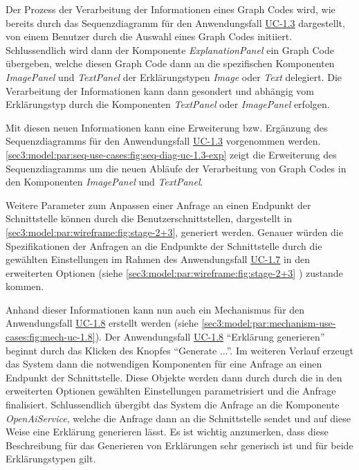 Der Prozess der Verarbeitung der Informationen eines Graph Codes wird, wie bereits durch das Sequenzdiagramm für den Anwendungsfall \hyperref[sec3:model:uc-1.3]{UC-1.3} dargestellt, von einem Benutzer durch die Auswahl eines Graph Codes initiiert.
Schlussendlich wird dann der Komponente \textit{ExplanationPanel} ein Graph Code übergeben, welche diesen Graph Code dann an die spezifischen Komponenten \textit{ImagePanel} und \textit{TextPanel} der Erklärungstypen \textit{Image} oder \textit{Text} delegiert.
Die Verarbeitung der Informationen kann dann gesondert und abhängig vom Erklärungstyp durch die Komponenten \textit{TextPanel} oder \textit{ImagePanel} erfolgen.

Mit diesen neuen Informationen kann eine Erweiterung bzw. Ergänzung des Sequenzdiagramms für den Anwendungsfall \hyperref[sec3:model:uc-1.3]{UC-1.3} vorgenommen werden.
\cref{sec3:model:par:seq-use-cases:fig:seq-diag-uc-1.3-exp} zeigt die Erweiterung des Sequenzdiagramms um die neuen Abläufe der Verarbeitung von Graph Codes in den Komponenten \textit{ImagePanel} und \textit{TextPanel}.




Weitere Parameter zum Anpassen einer Anfrage an einen Endpunkt der Schnittstelle können durch die Benutzerschnittstellen, dargestellt in \cref{sec3:model:par:wireframe:fig:stage-2+3}, generiert werden.
Genauer würden die Spezifikationen der Anfragen an die Endpunkte der Schnittstelle durch die gewählten Einstellungen im Rahmen des Anwendungsfall \hyperref[sec3:model:uc-1.7]{UC-1.7} in den erweiterten Optionen (siehe \cref{sec3:model:par:wireframe:fig:stage-2+3} ) zustande kommen.

Anhand dieser Informationen kann nun auch ein Mechanismus für den Anwendungsfall \hyperref[sec3:model:uc-1.8]{UC-1.8} erstellt werden (siehe \cref{sec3:model:par:mechanism-use-cases:fig:mech-uc-1.8}).
Der Anwendungsfall \hyperref[sec3:model:uc-1.8]{UC-1.8} \enquote{Erklärung generieren} beginnt durch das Klicken des Knopfes \enquote{Generate ...}.
Im weiteren Verlauf erzeugt das System dann die notwendigen Komponenten für eine Anfrage an einen Endpunkt der Schnittstelle.
Diese Objekte werden dann durch durch die in den erweiterten Optionen gewählten Einstellungen parametrisiert und die Anfrage finalisiert.
Schlussendlich übergibt das System die Anfrage an die Komponente \textit{OpenAiService}, welche die Anfrage dann an die Schnittstelle sendet und auf diese Weise eine Erklärung generieren lässt.
Es ist wichtig anzumerken, dass diese Beschreibung für das Generieren von Erklärungen sehr generisch ist und für beide Erklärungstypen gilt.

